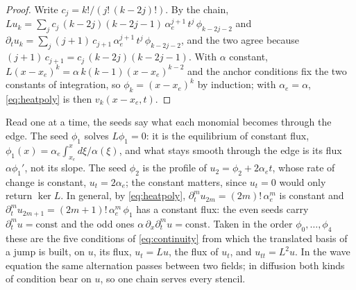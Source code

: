 \documentclass[11pt]{amsart}
\theoremstyle{definition}
\theoremstyle{remark}
\newcommand{\px}{\partial_x}
\newcommand{\pt}{\partial_t}
\begin{document}
\begin{proof}
Write $c_j = k! / (j!\, (k - 2j)!)$. By the chain,
$L u_k = \sum_j c_j\, (k - 2j)(k - 2j - 1)\, \alpha_e^{j+1}\, t^j\,
\phi_{k-2j-2}$ and $\pt u_k = \sum_j (j + 1)\, c_{j+1}\, \alpha_e^{j+1}\,
t^j\, \phi_{k-2j-2}$, and the two agree because
$(j + 1)\, c_{j+1} = c_j\, (k - 2j)(k - 2j - 1)$. With $\alpha$ constant,
$L (x - x_e)^k = \alpha\, k (k - 1) (x - x_e)^{k-2}$ and the anchor
conditions fix the two constants of integration, so $\phi_k = (x - x_e)^k$
by induction; with $\alpha_e = \alpha$, \eqref{eq:heatpoly} is then
$v_k(x - x_e, t)$.
\end{proof}

Read one at a time, the seeds say what each monomial becomes through the
edge. The seed $\phi_1$ solves $L \phi_1 = 0$: it is the equilibrium of
constant flux, $\phi_1(x) = \alpha_e \int_{x_e}^{x} d\xi / \alpha(\xi)$,
and what stays smooth through the edge is its flux $\alpha \phi_1'$, not
its slope. The seed $\phi_2$ is the profile of $u_2 = \phi_2 + 2 \alpha_e
t$, whose rate of change is constant, $u_t = 2 \alpha_e$; the constant
matters, since $u_t = 0$ would only return $\ker L$. In general, by
\eqref{eq:heatpoly}, $\pt^m u_{2m} = (2m)!\, \alpha_e^m$ is constant and
$\pt^m u_{2m+1} = (2m + 1)!\, \alpha_e^m\, \phi_1$ has a constant flux:
the even seeds carry $\pt^m u = \text{const}$ and the odd ones
$\alpha\, \px \pt^m u = \text{const}$. Taken in the order
$\phi_0, \ldots, \phi_4$ these are the five conditions of
\eqref{eq:continuity} from which the translated basis of a jump is built,
on $u$, its flux, $u_t = L u$, the flux of $u_t$, and $u_{tt} = L^2 u$. In
the wave equation the same alternation passes between two fields; in
diffusion both kinds of condition bear on $u$, so one chain serves every
stencil.
\end{document}
